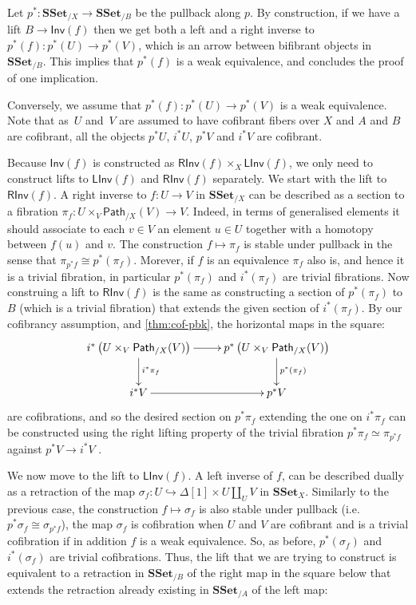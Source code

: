 \documentclass[reqno,10pt,a4paper,oneside,draft]{amsart}
\makeatletter
\renewenvironment{proof}[1][\proofname] {\par\pushQED{\qed}\normalfont\topsep6\p@\@plus6\p@\relax\trivlist\item[\hskip\labelsep\bf#1\@addpunct{.}]\ignorespaces}{\popQED\endtrivlist\@endpefalse}
\numberwithin{equation}{section}
\theoremstyle{mythm}
\theoremstyle{mydef}
\theoremstyle{myrmk}
\newcommand{\co}{\colon}
\newcommand{\SSet}{\mathbf{SSet}}
\newcommand{\Iseq}{\mathsf{Inv}}
\newcommand{\Linv}{\mathsf{LInv}}
\newcommand{\Rinv}{\mathsf{RInv}}
\newcommand{\Path}{\mathsf{Path}}
\makeatother
\begin{document}
\begin{proof} Let  $p^* \co \SSet_{/X} \to \SSet_{/B}$ be the pullback along $p$.
 By construction, if we have a lift $B \to \Iseq(f)$ then we get both a left and a right inverse to $p^*(f) \co p^*(U) \to p^*(V)$, which is an arrow between bifibrant objects in $\SSet_{/B}$. This implies that $p^*(f)$ is a weak equivalence, and concludes the proof of one implication.

Conversely, we assume that $p^*(f): p^*(U) \to p^*(V)$ is a weak equivalence. Note that as~$U$ and~$V$ are assumed to have cofibrant fibers over $X$ and $A$ and $B$ are cofibrant, all the objects $p^*U$, $i^*U$, $p^*V$ and $i^* V$ are cofibrant.

Because $\Iseq(f)$ is constructed as $\Rinv(f) \times_X \Linv(f)$, we only need to construct lifts to $\Linv(f)$ and $\Rinv(f)$ separately. We start with the lift to $\Rinv(f)$. A right inverse to $f : U \to V$ in $\SSet_{/X}$ can be described as a section to a fibration $\pi_f: U \times_V \Path_{/X}(V) \to V$. Indeed, in terms of generalised elements it should associate to each $v \in V$ an element $u\in U$ together with a homotopy between $f(u)$ and $v$. The construction  $f \mapsto \pi_f$ is stable under pullback in the sense that $\pi_{p^* f} \cong p^*(\pi_f)$. Morever, if $f$ is an equivalence $\pi_f$ also is, and hence it is a trivial fibration, in particular $p^*(\pi_f)$ and $i^*(\pi_f)$ are trivial fibrations. Now construing a lift to $\Rinv(f)$ is the same as constructing a section of $p^*(\pi_f)$ to $B$ (which is a trivial fibration) that extends the given section of $i^*(\pi_f)$. By our cofibrancy assumption, and \cref{thm:cof-pbk}, the horizontal maps in the square:
\[
\xymatrix{  i^*\left( U \times_V \Path_{/X}(V) \right) \ar[r] \ar[d]^{i^* \pi_f} & p^*\left( U \times_V \Path_{/X}(V) \right)  \ar[d]^{p^*(\pi_f)} \\
i^*V \ar[r] & p^* V
}
\]
are cofibrations, and so the desired section on $p^*\pi_f$ extending the one on $i^*\pi_f$ can be constructed using the right lifting property of the trivial fibration $p^* \pi_f \simeq \pi_{p^* f}$ against $p^*V \to i^* V$ .

  
We now move to the lift to $\Linv(f)$. A left inverse of $f$, can be described dually as a retraction of the map $\sigma_f: U \hookrightarrow \Delta[1] \times U \coprod_U V$ in $\SSet_X$. Similarly to the previous case, the construction $f \mapsto \sigma_f$ is also stable under pullback (i.e. $p^*\sigma_f \cong \sigma_{p^* f}$), the map $\sigma_f$ is cofibration when $U$ and $V$ are cofibrant and is a trivial cofibration if in addition $f$ is a weak equivalence. So, as before, $p^*(\sigma_f)$ and $i^*(\sigma_f)$ are trivial cofibrations. Thus, the lift that we are trying to construct is equivalent to a retraction in $\SSet_{/B}$ of the right map in the square below that extends the retraction already existing in $\SSet_{/A}$ of the left map:


\end{proof}
\end{document}
